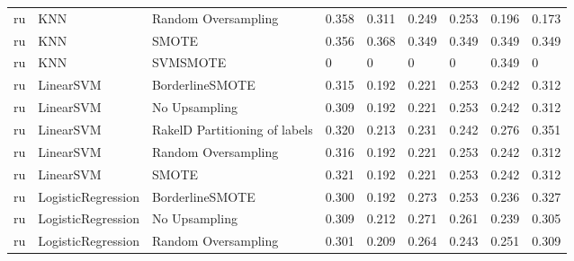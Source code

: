 \begin{tabular}{lllllllll}
      ru &                             KNN &           Random Oversampling & 0.358 &                     0.311 &                 0.249 &                  0.253 &                                   0.196 &     0.173 \\
      ru &                             KNN &                         SMOTE & 0.356 &                     0.368 &                 0.349 &                  0.349 &                                   0.349 &     0.349 \\
      ru &                             KNN &                      SVMSMOTE &     0 &                         0 &                     0 &                      0 &                                   0.349 &         0 \\
      ru &                       LinearSVM &               BorderlineSMOTE & 0.315 &                     0.192 &                 0.221 &                  0.253 &                                   0.242 &     0.312 \\
      ru &                       LinearSVM &                 No Upsampling & 0.309 &                     0.192 &                 0.221 &                  0.253 &                                   0.242 &     0.312 \\
      ru &                       LinearSVM & RakelD Partitioning of labels & 0.320 &                     0.213 &                 0.231 &                  0.242 &                                   0.276 &     0.351 \\
      ru &                       LinearSVM &           Random Oversampling & 0.316 &                     0.192 &                 0.221 &                  0.253 &                                   0.242 &     0.312 \\
      ru &                       LinearSVM &                         SMOTE & 0.321 &                     0.192 &                 0.221 &                  0.253 &                                   0.242 &     0.312 \\
      ru &              LogisticRegression &               BorderlineSMOTE & 0.300 &                     0.192 &                 0.273 &                  0.253 &                                   0.236 &     0.327 \\
      ru &              LogisticRegression &                 No Upsampling & 0.309 &                     0.212 &                 0.271 &                  0.261 &                                   0.239 &     0.305 \\
      ru &              LogisticRegression &           Random Oversampling & 0.301 &                     0.209 &                 0.264 &                  0.243 &                                   0.251 &     0.309 \\

\end{tabular}
